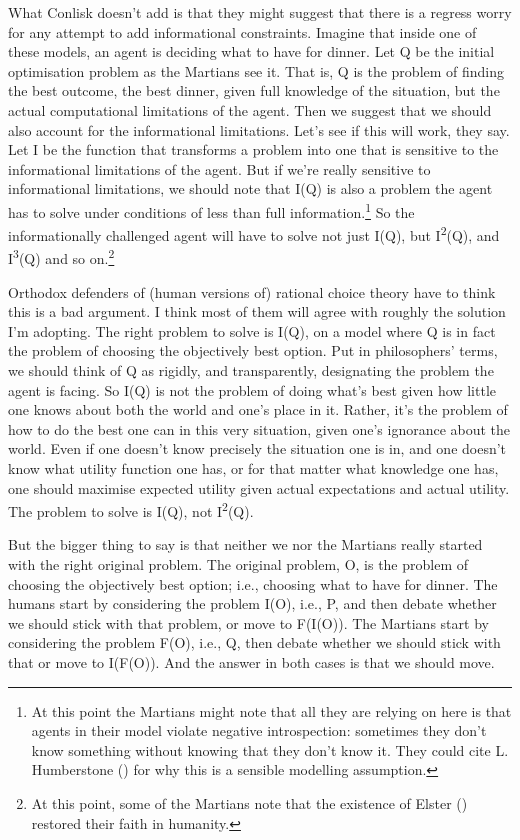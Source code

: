 \documentclass[
  10pt,
  letterpaper,
  twoside]{scrbook}
\begin{document}
What Conlisk doesn't add is that they might suggest that there is a
regress worry for any attempt to add informational constraints. Imagine
that inside one of these models, an agent is deciding what to have for
dinner. Let Q be the initial optimisation problem as the Martians see
it. That is, Q is the problem of finding the best outcome, the best
dinner, given full knowledge of the situation, but the actual
computational limitations of the agent. Then we suggest that we should
also account for the informational limitations. Let's see if this will
work, they say. Let I be the function that transforms a problem into one
that is sensitive to the informational limitations of the agent. But if
we're really sensitive to informational limitations, we should note that
I(Q) is also a problem the agent has to solve under conditions of less
than full information.\footnote{At this point the Martians might note
  that all they are relying on here is that agents in their model
  violate negative introspection: sometimes they don't know something
  without knowing that they don't know it. They could cite L.
  Humberstone () for why
  this is a sensible modelling assumption.} So the informationally
challenged agent will have to solve not just I(Q), but
I\textsuperscript{2}(Q), and I\textsuperscript{3}(Q) and so
on.\footnote{At this point, some of the Martians note that the existence
  of Elster () restored their faith in
  humanity.}

Orthodox defenders of (human versions of) rational choice theory have to
think this is a bad argument. I think most of them will agree with
roughly the solution I'm adopting. The right problem to solve is I(Q),
on a model where Q is in fact the problem of choosing the objectively
best option. Put in philosophers' terms, we should think of Q as
rigidly, and transparently, designating the problem the agent is facing.
So I(Q) is not the problem of doing what's best given how little one
knows about both the world and one's place in it. Rather, it's the
problem of how to do the best one can in this very situation, given
one's ignorance about the world. Even if one doesn't know precisely the
situation one is in, and one doesn't know what utility function one has,
or for that matter what knowledge one has, one should maximise expected
utility given actual expectations and actual utility. The problem to
solve is I(Q), not I\textsuperscript{2}(Q).

But the bigger thing to say is that neither we nor the Martians really
started with the right original problem. The original problem, O, is the
problem of choosing the objectively best option; i.e., choosing what to
have for dinner. The humans start by considering the problem I(O), i.e.,
P, and then debate whether we should stick with that problem, or move to
F(I(O)). The Martians start by considering the problem F(O), i.e., Q,
then debate whether we should stick with that or move to I(F(O)). And
the answer in both cases is that we should move.
\end{document}
